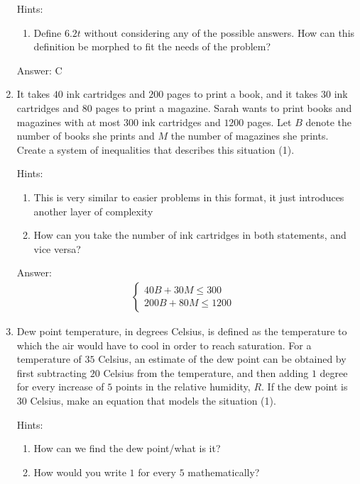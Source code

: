 \documentclass{article}
\begin{document}
\begin{enumerate}
{	      Hints:
	      \begin{enumerate}
		      \item{Define $6.2t$ without considering any of the possible answers. How can this definition be morphed to fit the needs of the problem?}
	      \end{enumerate}

	      Answer: C
	      }

	\item{It takes $40$ ink cartridges and $200$ pages to print a book, and it takes $30$ ink cartridges and $80$ pages to print a magazine. Sarah wants to print books and magazines with at most $300$ ink cartridges and $1200$ pages. Let $B$ denote the number of books she prints and $M$ the number of magazines she prints. Create a system of inequalities that describes this situation (1).

	      Hints:
	      \begin{enumerate}
		      \item{This is very similar to easier problems in this format, it just introduces another layer of complexity}
		      \item{How can you take the number of ink cartridges in both statements, and vice versa?}
	      \end{enumerate}

	      Answer:
	      \[
		      \begin{array}{l}
			      \begin{cases}
				      40B+30M \leq 300 & \\
				      200B+80M \leq 1200
			      \end{cases}
		      \end{array}
	      \]
	      }

	\item{Dew point temperature, in degrees Celsius, is defined as the temperature to which the air would have to cool in order to reach saturation. For a temperature of $35$ Celsius, an estimate of the dew point can be obtained by first subtracting $20$ Celsius from the temperature, and then adding $1$ degree for every increase of $5$ points in the relative humidity, $R$. If the dew point is $30$ Celsius, make an equation that models the situation (1).

	      Hints:
	      \begin{enumerate}
		      \item{How can we find the dew point/what is it?}
		      \item{How would you write $1$ for every $5$ mathematically?}
	      \end{enumerate}

}
\end{enumerate}
\end{document}
